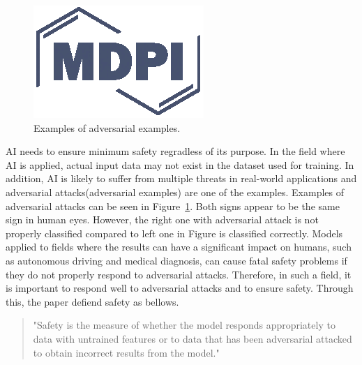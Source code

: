 \documentclass[journal,article,submit,moreauthors,pdftex]{Definitions/mdpi}
\begin{document}
\begin{figure}[H] %
\includegraphics[width=5 cm]{Definitions/logo-mdpi}
\caption{Examples of adversarial examples.\label{fig1}}
\end{figure}   

AI needs to ensure minimum safety regradless of its purpose. In the field where AI is applied, actual input data may not exist in the dataset used for training.
In addition, AI is likely to suffer from multiple threats in real-world applications and adversarial attacks(adversarial examples) are one of the examples.
Examples of adversarial attacks can be seen in Figure~\ref{fig1}. Both signs appear to be the same sign in human eyes. However, the right one with adversarial attack is not properly classified compared to left one in Figure is classified correctly.
Models applied to fields where the results can have a significant impact on humans, such as autonomous driving and medical diagnosis, can cause fatal safety problems if they do not properly respond to adversarial attacks. Therefore, in such a field, it is important to respond well to adversarial attacks and to ensure safety.
Through this, the paper defiend safety as bellows.

\begin{quote}
    "Safety is the measure of whether the model responds appropriately to data with untrained features or to data that has been adversarial attacked to obtain incorrect results from the model."
\end{quote}
\end{document}

